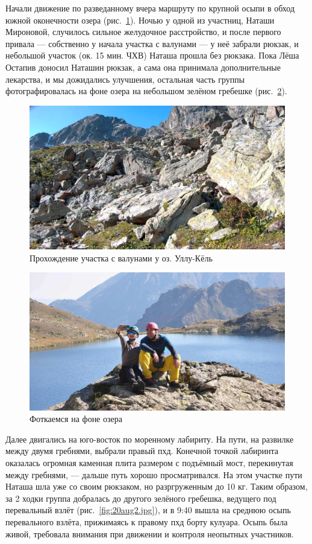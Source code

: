 Начали движение по разведанному вчера маршруту по крупной осыпи в обход южной оконечности озера (рис.~\ref{ullu_koel_lake_stones}). Ночью у одной из участниц, Наташи Мироновой, случилось сильное желудочное расстройство, и после первого  привала --- собственно у начала участка с валунами --- у неё забрали рюкзак, и небольшой участок (ок. 15 мин. ЧХВ) Наташа прошла без рюкзака. Пока Лёша Остапив доносил Наташин рюкзак, а сама она принимала дополнительные лекарства, и мы дожидались улучшения, остальная часть группы фотографировалась на фоне озера на небольшом зелёном гребешке (рис.~\ref{fig:DSC_0907}).
\begin{figure}[h!]
	\centering
	\includegraphics[width=0.7\linewidth]{../pics/ullu_koel_lake_stones.jpg}
	\caption{Прохождение участка с валунами у оз. Уллу-Кёль}
	\label{ullu_koel_lake_stones}
\end{figure}
 
\begin{figure}[h!]
 \centering
 \includegraphics[width=0.7\linewidth]{../pics/DSC_0907}
 \caption{Фоткаемся на фоне озера}
 \label{fig:DSC_0907}
\end{figure}

Далее двигались на юго-восток по моренному лабириту. На пути, на развилке между двумя гребнями, выбрали правый пхд. Конечной точкой лабиринта оказалась огромная каменная плита размером с подъёмный мост, перекинутая между гребнями, --- дальше путь хорошо просматривался. На этом участке пути Наташа шла уже со своим рюкзаком, но разргруженным до 10 кг. Таким образом, за 2 ходки группа добралась до другого зелёного гребешка, ведущего под перевальный взлёт (рис.~\ref{fig:20aug2.jpg}), и в 9:40 вышла на среднюю осыпь перевального взлёта, прижимаясь к правому пхд борту кулуара. Осыпь была живой, требовала внимания при движении и контроля неопытных участников.

